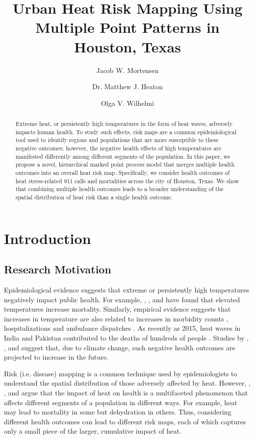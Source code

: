 \documentclass[final]{statsoc}
\title[Risk Mapping - Multiple Point Patterns]{Urban Heat Risk Mapping Using Multiple Point Patterns in Houston, Texas}
\author{Jacob W. Mortensen}
\author[Heaton]{Dr. Matthew J. Heaton}
\author[Mortensen, Heaton \& Wilhelmi]{Olga V. Wilhelmi}
\begin{document}
\begin{abstract}
Extreme heat, or persistently high temperatures in the form of heat waves,
adversely impacts human health. To study such effects, risk maps are a common
epidemiological tool used to identify regions and populations that are
more susceptible to these negative outcomes; however, the negative health 
effects of high temperatures are manifested differently among
different segments of the population. In this paper, we propose a novel,
hierarchical marked point process model that merges multiple health outcomes
into an overall heat risk map. Specifically, we consider health outcomes of  heat stress-related 911 calls and mortalities across the city of Houston, Texas. We show that combining multiple health outcomes leads to a broader
understanding of the spatial distribution of heat risk than a single 
health outcome.
\end{abstract}

\section{Introduction}
\subsection{Research Motivation}
Epidemiological evidence suggests that extreme or persistently high
temperatures negatively impact public health. For example, \cite{Basu2002},
\cite{Gosling2009}, \cite{Anderson2011} and \cite{Gasparrini2011}
have found that elevated temperatures increase mortality. Similarly,
empirical evidence suggests that increases in temperature are also 
related to increases in morbidity counts \citep{Li2012}, hospitalizations
\citep{Rusticucci2002,Schaffer2012} and ambulance
dispatches \citep{Ng2014}. As recently as 2015, heat waves in India 
and Pakistan contributed to the deaths of hundreds of people \citep{Mohsin2015}.
Studies by \cite{Luber2008}, \cite{Meehl2004}, \cite{Nicholls2009} and
\cite{Peng2011} suggest that, due to climate change, such negative
health outcomes are projected to increase in the future.

Risk (i.e. disease) mapping \citep{Lawson2013} is a common technique
used by epidemiologists to understand the spatial distribution
of those adversely affected by heat. However, \cite{Wilhelmi2010},
\cite{Wolf2010}, \cite{Uejio2011} and \cite{Heaton2014}
argue that the impact of heat on health is a multifaceted phenomenon that affects different 
segments of a population in different ways. For example, heat may lead to mortality
in some but dehydration in others. Thus, considering different health
outcomes can lead to different risk maps, each of which captures only a small
piece of the larger, cumulative impact of heat.
\end{document}

